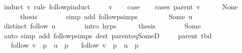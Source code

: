 \begin{isabellebody}
\ {\isacharparenleft}{\kern0pt}induct\ v\ rule{\isacharcolon}{\kern0pt}\ follow{\isacharunderscore}{\kern0pt}pinduct{\isacharparenright}{\kern0pt}\isanewline
\ \ \isamarkupfalse%
\ {\isacharparenleft}{\kern0pt}{}\ v{\isacharparenright}{\kern0pt}\isanewline
\ \ \isamarkupfalse%
\ {\isacharquery}{\kern0pt}case\isanewline
\ \ \isamarkupfalse%
\ {\isacharparenleft}{\kern0pt}cases\ {\isachardoublequoteopen}parent\ v{\isachardoublequoteclose}{\isacharparenright}{\kern0pt}\isanewline
\ \ \ \ \isamarkupfalse%
\ None\isanewline
\ \ \ \ \isamarkupfalse%
\ {\isacharquery}{\kern0pt}thesis\isanewline
\ \ \ \ \ \ \isamarkupfalse%
\ {\isacharparenleft}{\kern0pt}simp\ add{\isacharcolon}{\kern0pt}\ follow{\isacharunderscore}{\kern0pt}psimps{\isacharparenright}{\kern0pt}\isanewline
\ \ \isamarkupfalse%
\isanewline
\ \ \ \ \isamarkupfalse%
\ {\isacharparenleft}{\kern0pt}Some\ u{\isacharparenright}{\kern0pt}\isanewline
\ \ \ \ \isamarkupfalse%
\ {\isachardoublequoteopen}distinct\ {\isacharparenleft}{\kern0pt}follow\ u{\isacharparenright}{\kern0pt}{\isachardoublequoteclose}\isanewline
\ \ \ \ \ \ \isamarkupfalse%
\ {\isacharparenleft}{\kern0pt}intro\ {\isachardoublequoteopen}{}{\isachardot}{\kern0pt}hyps{\isachardoublequoteclose}{\isacharparenright}{\kern0pt}\isanewline
\ \ \ \ \isamarkupfalse%
\ {\isacharquery}{\kern0pt}thesis\isanewline
\ \ \ \ \ \ \isamarkupfalse%
\ Some\isanewline
\ \ \ \ \ \ \isamarkupfalse%
\ {\isacharparenleft}{\kern0pt}auto\ simp\ add{\isacharcolon}{\kern0pt}\ follow{\isacharunderscore}{\kern0pt}psimps\ dest{\isacharcolon}{\kern0pt}\ parent{\isacharunderscore}{\kern0pt}eq{\isacharunderscore}{\kern0pt}SomeD{\isacharparenright}{\kern0pt}\isanewline
\ \ \isamarkupfalse%
\isanewline
{}\isamarkupfalse%
%
\endisatagproof
{\isafoldproof}%
%
\isadelimproof
\isanewline
%
\endisadelimproof
\isanewline
\isanewline
{}\isamarkupfalse%
\ {\isacharparenleft}{\kern0pt}\ parent{\isacharparenright}{\kern0pt}\ tbd{\isacharcolon}{\kern0pt}\isanewline
\ \ \ {\isachardoublequoteopen}follow\ v{}\ {\isacharequal}{\kern0pt}\ p{}\ {\isacharat}{\kern0pt}\ u\ {\isacharhash}{\kern0pt}\ p{}{\isacharprime}{\kern0pt}{\isachardoublequoteclose}\isanewline
\ \ \ {\isachardoublequoteopen}follow\ v{}\ {\isacharequal}{\kern0pt}\ p{}\ {\isacharat}{\kern0pt}\ u\ {\isacharhash}{\kern0pt}\ p{}{\isacharprime}{\kern0pt}{\isachardoublequoteclose}\isanewline

\end{isabellebody}
